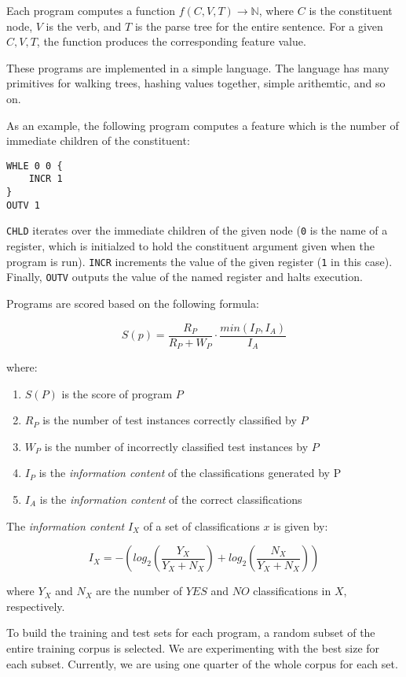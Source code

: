 \documentclass{article}
\begin{document}
Each program computes a function $f(C,V,T) \rightarrow \mathbb{N}$, where
$C$ is the constituent node, $V$ is the verb, and $T$ is the parse tree
for the entire sentence.  For a given $C,V,T$, the function produces
the corresponding feature value.

These programs are implemented in a simple language.  The language has
many primitives for walking trees, hashing values together, simple
arithemtic, and so on.

As an example, the following program computes a feature which is the
number of immediate children of the constituent:

\begin{verbatim}
WHLE 0 0 {
    INCR 1
}
OUTV 1
\end{verbatim}

{\tt CHLD} iterates over the immediate children of the given node ({\tt 0}
is the name of a register, which is initialzed to hold the constituent
argument given when the program is run).  {\tt INCR} increments the
value of the given register ({\tt 1} in this case).  Finally,
{\tt OUTV} outputs the value of the named register and halts execution.

Programs are scored based on the following formula:

\[S(p) = \frac{R_P}{R_P+W_P} \cdot \frac{min(I_P,I_A)}{I_A}\]

where:

\begin{enumerate}
\item $S(P)$ is the score of program $P$
\item $R_P$ is the number of test instances correctly classified by $P$
\item $W_P$ is the number of incorrectly classified test instances by $P$
\item $I_P$ is the {\it information content} of the classifications
generated by P
\item $I_A$ is the {\it information content} of the correct classifications
\end{enumerate}

The {\it information content} $I_X$ of a set of classifications $x$ is
given by:

\[I_X = -(log_2(\frac{Y_X}{Y_X + N_X}) + log_2(\frac{N_X}{Y_X + N_X}))\]

where $Y_X$ and $N_X$ are the number of $YES$ and $NO$ classifications
in $X$, respectively.

To build the training and test sets for each program, a random subset
of the entire training corpus is selected.  We are experimenting with
the best size for each subset.  Currently, we are using one quarter
of the whole corpus for each set.
\end{document}
